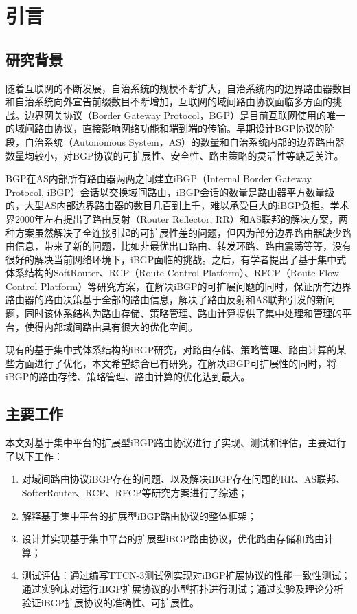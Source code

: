 \chapter{引言}
\label{cha:intro}


\section{研究背景}

随着互联网的不断发展，自治系统的规模不断扩大，自治系统内的边界路由器数目和自治系统向外宣告前缀数目不断增加，互联网的域间路由协议面临多方面的挑战。边界网关协议（Border Gateway Protocol，BGP）是目前互联网使用的唯一的域间路由协议，直接影响网络功能和端到端的传输。早期设计BGP协议的阶段，自治系统（Autonomous System，AS）的数量和自治系统内部的边界路由器数量均较小，对BGP协议的可扩展性、安全性、路由策略的灵活性等缺乏关注。

BGP在AS内部所有路由器两两之间建立iBGP（Internal Border Gateway Protocol, iBGP）会话以交换域间路由，iBGP会话的数量是路由器平方数量级的，大型AS内部边界路由器的数目几百到上千，难以承受巨大的iBGP负担。学术界2000年左右提出了路由反射（Router Reflector, RR）和AS联邦的解决方案，两种方案虽然解决了全连接引起的可扩展性差的问题，但因为部分边界路由器缺少路由信息，带来了新的问题，比如非最优出口路由、转发环路、路由震荡等等，没有很好的解决当前网络环境下，iBGP面临的挑战。之后，有学者提出了基于集中式体系结构的SoftRouter、RCP（Route Control Platform）、RFCP（Route Flow Control Platform）等研究方案，在解决iBGP的可扩展问题的同时，保证所有边界路由器的路由决策基于全部的路由信息，解决了路由反射和AS联邦引发的新问题，同时该体系结构为路由存储、策略管理、路由计算提供了集中处理和管理的平台，使得内部域间路由具有很大的优化空间。

现有的基于集中式体系结构的iBGP研究，对路由存储、策略管理、路由计算的某些方面进行了优化，本文希望综合已有研究，在解决iBGP可扩展性的同时，将iBGP的路由存储、策略管理、路由计算的优化达到最大。

\section{主要工作}

本文对基于集中平台的扩展型iBGP路由协议进行了实现、测试和评估，主要进行了以下工作：
\begin{enumerate}
\item 对域间路由协议iBGP存在的问题、以及解决iBGP存在问题的RR、AS联邦、SofterRouter、RCP、RFCP等研究方案进行了综述；
\item 解释基于集中平台的扩展型iBGP路由协议的整体框架；
\item 设计并实现基于集中平台的扩展型iBGP路由协议，优化路由存储和路由计算；
\item 测试评估：通过编写TTCN-3测试例实现对iBGP扩展协议的性能一致性测试；通过实验床对运行iBGP扩展协议的小型拓扑进行测试；通过实验及理论分析验证iBGP扩展协议的准确性、可扩展性。
\end{enumerate}




